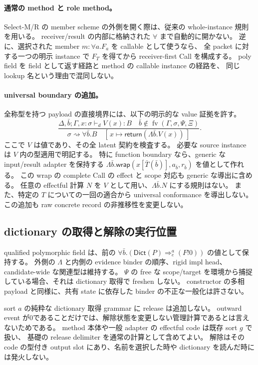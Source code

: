\documentclass[11pt,a4paper]{article}
\newcommand{\Ret}{\mathsf{return}}
\newcommand{\Wrap}{\mathsf{wrap}}
\newcommand{\Dict}{\mathsf{Dict}}
\newcommand{\fv}{\operatorname{fv}}
\newcommand{\Ty}{\mathrel{\vdash_d}}
\newcommand{\Dir}{\mathrel{\rightsquigarrow}}
\begin{document}
\paragraph{通常の method と role method。}
Select-M/R の member scheme の外側を開く際は、従来の whole-instance 規則を用いる。
receiver/result の内部に格納された \(\forall\) まで自動的に開かない。
逆に、選択された member \(m:\forall a.F_a\) を callable として使うなら、
全 packet に対する一つの明示 instance で \(F_T\) を得てから receiver-first Call を構成する。
poly field を field として返す経路と method の callable instance の経路を、
同じ lookup 名という理由で混同しない。

\paragraph{universal boundary の追加。}
全称型を持つ payload の直接境界には、以下の明示的な value 証拠を許す。
\[
 \frac{\Delta,\bar b;\Gamma,x:\sigma\Ty V(x):B
       \quad\bar b\notin\fv(\Gamma,\sigma,\Psi,\Xi)}
      {\sigma\Dir\forall\bar b.B
       \quad[\,x\mapsto\Ret(\Lambda\bar b.V(x))\,]}.
\]
ここで \(V\) は値であり、その全 latent 契約を検査する。
必要な source instance は \(V\) 内の型適用で明記する。
特に function boundary なら、generic な input/result adapter を保持する
\(\Lambda\bar b.\Wrap(x[\bar T(\bar b)],a_{\bar b},r_{\bar b})\) を値として作れる。
この wrap の complete Call の effect と scope 対応も generic な導出に含める。
任意の effectful 計算 \(N\) を \(V\) として用い、\(\Lambda\bar b.N\) にする規則はない。
また、特定の \(T\) についての一回の適合から universal conformance を導出しない。
この追加も raw concrete record の非推移性を変更しない。

\subsection{dictionary の取得と解除の実行位置}

qualified polymorphic field は、前の
\(\forall\bar b.(\Dict(P)\Rightarrow_e^a(F!0))\) の値として保持する。
外側の \(\Lambda\) と内側の evidence binder の順序、rigid impl head、candidate-wide な関連型は維持する。
\(\Psi\) の free な scope/target を環境から捕捉している場合、それは dictionary 取得で freshen しない。
constructor の多相 payload と同様に、共有 state に依存した binder の不正な一般化は許さない。

sort \(a\) の純粋な dictionary 取得 grammar に release は追加しない。
outward event が0であることだけでは、解除状態を変更しない管理計算であるとは言えないためである。
method 本体や一般 adapter の effectful code は既存 sort \(g\) で扱い、
基礎の release delimiter を通常の計算として含めてよい。
解除はその code の型付き output slot にあり、名前を選択した時や dictionary を読んだ時には発火しない。
\end{document}
